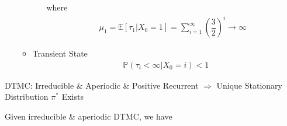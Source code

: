 \begin{itemize}[topsep=2pt,itemsep=0pt]
\begin{itemize}[topsep=2pt,itemsep=0pt]
\begin{itemize}[topsep=2pt,itemsep=0pt]
\begin{center}
                \end{center}

                where 
                \begin{align*}
                    \mu _1=\mathbb{E}\left[ \tau_1|X_0=1 \right]=\sum_{i=1}^\infty \left(\dfrac{3}{2}\right)^i\to\infty   
                \end{align*}
                
                

            \end{itemize} 
            \item Transient State
            \begin{align*}
                \mathbb{P}\left( \tau_i<\infty|X_0=i    \right)<1 
            \end{align*}
        \end{itemize}
        
            
    \end{itemize}
    
\begin{point}
    DTMC: Irreducible \& Aperiodic \& Positive Recurrent $ \Rightarrow  $ Unique Stationary Distribution $ \pi^* $ Exists
\end{point}

Given irreducible \& aperiodic DTMC, we have 

